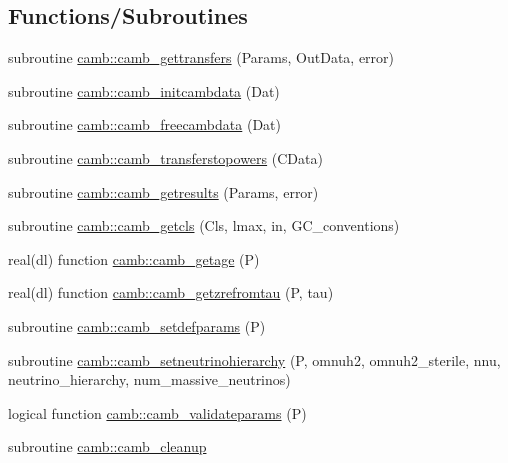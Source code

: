 \subsection*{Functions/\+Subroutines}
\begin{DoxyCompactItemize}
\item 
subroutine \mbox{\hyperlink{namespacecamb_ae587b573e03da5811edb59806305b2cd}{camb\+::camb\+\_\+gettransfers}} (Params, Out\+Data, error)
\item 
subroutine \mbox{\hyperlink{namespacecamb_a64195b97e1e4c42b990076ff2bff6f1d}{camb\+::camb\+\_\+initcambdata}} (Dat)
\item 
subroutine \mbox{\hyperlink{namespacecamb_a20b57e6f6098c5800cbf374d96307d13}{camb\+::camb\+\_\+freecambdata}} (Dat)
\item 
subroutine \mbox{\hyperlink{namespacecamb_a9fb2095034057d44dc9526dd02d60064}{camb\+::camb\+\_\+transferstopowers}} (C\+Data)
\item 
subroutine \mbox{\hyperlink{namespacecamb_af6f4c73133d3de79ac10db3c4b2d0650}{camb\+::camb\+\_\+getresults}} (Params, error)
\item 
subroutine \mbox{\hyperlink{namespacecamb_abeb0ae530a720a17a76108dbed29c1fc}{camb\+::camb\+\_\+getcls}} (Cls, lmax, in, G\+C\+\_\+conventions)
\item 
real(dl) function \mbox{\hyperlink{namespacecamb_a53e4d3ff396030bd7e41d606cfa458b2}{camb\+::camb\+\_\+getage}} (P)
\item 
real(dl) function \mbox{\hyperlink{namespacecamb_ab45910129412993d163c3d4b83e19152}{camb\+::camb\+\_\+getzrefromtau}} (P, tau)
\item 
subroutine \mbox{\hyperlink{namespacecamb_a6ce30ab6419006324d56d3e4434530f9}{camb\+::camb\+\_\+setdefparams}} (P)
\item 
subroutine \mbox{\hyperlink{namespacecamb_ad303911c183f5affcdc9665c5facdd4b}{camb\+::camb\+\_\+setneutrinohierarchy}} (P, omnuh2, omnuh2\+\_\+sterile, nnu, neutrino\+\_\+hierarchy, num\+\_\+massive\+\_\+neutrinos)
\item 
logical function \mbox{\hyperlink{namespacecamb_ae9577b86a4f0803e5754a23871a7113e}{camb\+::camb\+\_\+validateparams}} (P)
\item 
subroutine \mbox{\hyperlink{namespacecamb_a70f3206a0056ea3ff96defbc4d2be548}{camb\+::camb\+\_\+cleanup}}
\end{DoxyCompactItemize}

